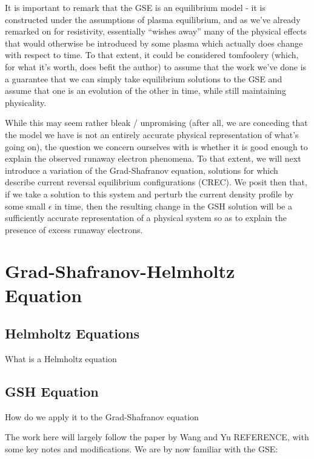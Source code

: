 It is important to remark that the GSE is an equilibrium model - it is constructed under the assumptions of plasma equilibrium, and as we've 
already remarked on for resistivity, essentially ``wishes away'' many of the physical effects that would otherwise be introduced by some plasma which actually does 
change with respect to time. To that extent, 
it could be considered tomfoolery (which, for what it's worth, does befit the author) to assume that the work we've done is a guarantee that 
we can simply take equilibrium solutions to the GSE and assume that one is an evolution of the other in time, while still maintaining physicality.

While this may seem rather bleak / unpromising (after all, we are conceding that the model we have is not an entirely accurate 
physical representation of what's going on), the question we concern ourselves with is whether it is good enough to explain 
the observed runaway electron phenomena. To that extent, we will next introduce a variation of the Grad-Shafranov equation, 
solutions for which describe current reversal equilibrium configurations (CREC). We posit then that, if we take a 
solution to this system and perturb the current density profile by some small $\epsilon$ in time, then the resulting 
change in the GSH solution will be a sufficiently accurate representation of a physical system so as to explain the 
presence of excess runaway electrons.

\section{Grad-Shafranov-Helmholtz Equation}

\subsection{Helmholtz Equations}

What is a Helmholtz equation 

\subsection{GSH Equation}
How do we apply it to the Grad-Shafranov equation

The work here will largely follow the paper by Wang and Yu REFERENCE,
with some key notes and modifications. We are by now familiar with the 
GSE:


